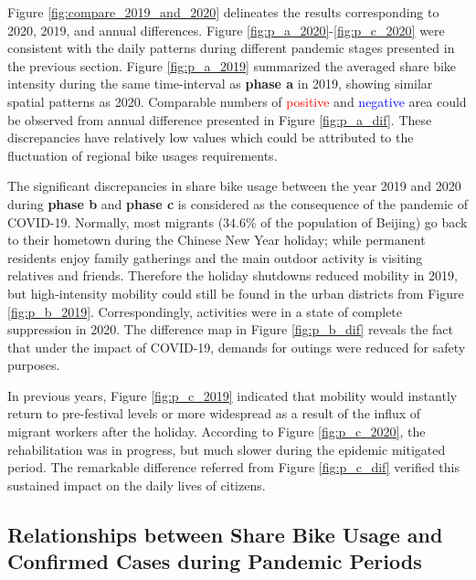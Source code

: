 \documentclass[ijgi,submit,moreauthors,pdftex]{Definitions/mdpi}
\begin{document}
Figure \ref{fig:compare_2019_and_2020} delineates the results corresponding to 2020, 2019, and annual differences.
Figure \ref{fig:p_a_2020}-\ref{fig:p_c_2020} were consistent with the daily patterns during different pandemic stages presented in the previous section.
Figure \ref{fig:p_a_2019} summarized the averaged share bike intensity during the same time-interval as \textbf{phase a} in 2019, showing similar spatial patterns as 2020. 
Comparable numbers of \textcolor{red}{positive} and \textcolor{blue}{negative} area could be observed from annual difference presented in Figure \ref{fig:p_a_dif}. These discrepancies have relatively low values which could be attributed to the fluctuation of regional bike usages requirements.  

The significant discrepancies in share bike usage between the year 2019 and 2020 during \textbf{phase b} and \textbf{phase c} is considered as the consequence of the pandemic of COVID-19. 
Normally, most migrants ($34.6\%$ of the population of Beijing) go back to their hometown during the Chinese New Year holiday; while permanent residents enjoy family gatherings and the main outdoor activity is visiting relatives and friends.
Therefore the holiday shutdowns reduced mobility in 2019, but high-intensity mobility could still be found in the urban districts from Figure \ref{fig:p_b_2019}. 
Correspondingly, activities were in a state of complete suppression in 2020. 
The difference map in Figure \ref{fig:p_b_dif} reveals the fact that under the impact of COVID-19, demands for outings were reduced for safety purposes.

In previous years, Figure \ref{fig:p_c_2019} indicated that mobility would instantly return to pre-festival levels or more widespread as a result of the influx of migrant workers after the holiday.
According to Figure \ref{fig:p_c_2020}, the rehabilitation was in progress, but much slower during the epidemic mitigated period.
The remarkable difference referred from Figure \ref{fig:p_c_dif} verified this sustained impact on the daily lives of citizens.

\subsection{Relationships between Share Bike Usage and Confirmed Cases during Pandemic Periods} \label{sec:activities_confirmed_cases}
\end{document}
